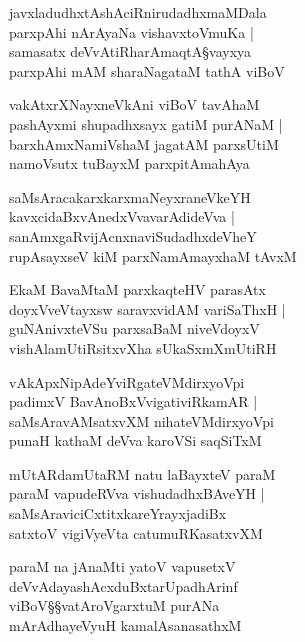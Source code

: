 \begin{shloka}
javxladudhxtAshAciRnirudadhxmaMDala\\
parxpAhi nArAyaNa vishavxtoVmuKa |\\
samasatx deVvAtiRharAmaqtA\S vayxya\\
parxpAhi mAM sharaNagataM tathA viBoV
\end{shloka}

\begin{shloka}
vakAtxrXNayxneVkAni viBoV tavAhaM\\
pashAyxmi shupadhxsayx gatiM purANaM |\\
barxhAmxNamiVshaM jagatAM parxsUtiM\\ 
namoVsutx tuBayxM parxpitAmahAya
\end{shloka}

\begin{shloka}
saMsAracakarxkarxmaNeyxraneVkeYH\\
kavxcidaBxvAnedxVvavarAdideVva |\\
sanAmxgaRvijAcnxnaviSudadhxdeVheY\\
rupAsayxseV kiM parxNamAmayxhaM tAvxM
\end{shloka}

\begin{shloka}
EkaM BavaMtaM parxkaqteHV parasAtx\\
doyxVveVtayxsw saravxvidAM variSaThxH |\\
guNAnivxteVSu parxsaBaM niveVdoyxV\\
vishAlamUtiRsitxvXha sUkaSxmXmUtiRH 
\end{shloka}

\begin{shloka}
vAkApxNipAdeYviRgateVMdirxyoVpi\\
padimxV BavAnoBxVvigativiRkamAR |\\
saMsAravAMsatxvXM nihateVMdirxyoVpi\\ 
punaH kathaM deVva karoVSi saqSiTxM
\end{shloka}

\begin{shloka}
mUtARdamUtaRM natu laBayxteV paraM\\
paraM vapudeRVva vishudadhxBAveYH |\\
saMsAraviciCxtitxkareYrayxjadiBx\\
satxtoV vigiVyeVta catumuRKasatxvXM
\end{shloka}

\begin{shloka}
paraM na jAnaMti yatoV vapusetxV \\
deVvAdayashAcxduBxtarUpadhArinf \\
viBoV\S\S vatAroVgarxtuM purANa\\
mArAdhayeVyuH kamalAsanasathxM
\end{shloka}

